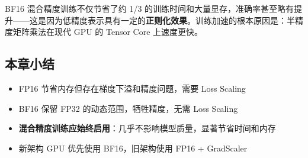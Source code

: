 BF16 混合精度训练不仅节省了约 1/3 的训练时间和大量显存，准确率甚至略有提升——这是因为低精度表示具有一定的\textbf{正则化效果}。训练加速的根本原因是：半精度矩阵乘法在现代 GPU 的 Tensor Core 上速度更快。

\subsection{本章小结}

\begin{itemize}
    \item FP16 节省内存但存在梯度下溢和精度问题，需要 Loss Scaling
    \item BF16 保留 FP32 的动态范围，牺牲精度，无需 Loss Scaling
    \item \textbf{混合精度训练应始终启用}：几乎不影响模型质量，显著节省时间和内存
    \item 新架构 GPU 优先使用 BF16，旧架构使用 FP16 + GradScaler
\end{itemize}


